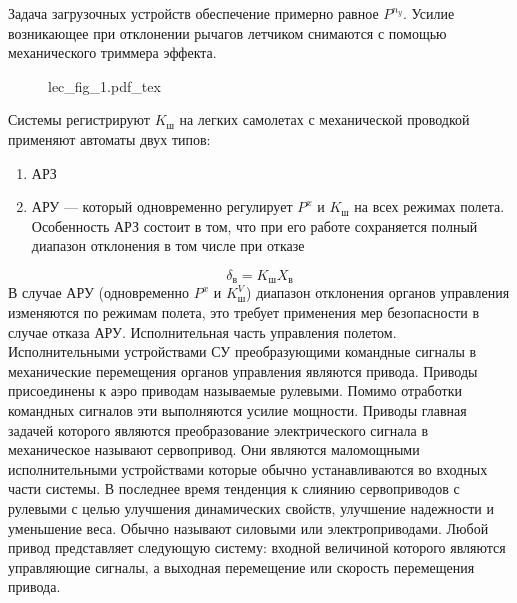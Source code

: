 \documentclass{article}
\begin{document}
Задача загрузочных устройств обеспечение примерно равное $P^{n_y}$. Усилие
возникающее при отклонении рычагов летчиком снимаются с помощью механического
триммера эффекта.
\begin{figure}[ht!]
	\centering
	{lec_fig_1.pdf_tex}
\end{figure}
Системы регистрируют $K_\text{ш}$ на легких самолетах с механической проводкой
применяют автоматы двух типов:
\begin{enumerate}
	\item АРЗ
	\item АРУ --- который одновременно регулирует $P^{x}$ и $K_\text{ш}$ на
	      всех режимах полета. Особенность АРЗ состоит в том, что при его работе
	      сохраняется полный диапазон отклонения в том числе при отказе
\end{enumerate}
\[
	\delta_\text{в} = K_\text{ш} X_\text{в}
\]
В случае АРУ (одновременно $P^{x}$ и $K_\text{ш}^V$) диапазон отклонения
органов управления изменяются по режимам полета, это требует применения мер
безопасности в случае отказа АРУ.
Исполнительная часть управления полетом.
Исполнительными устройствами СУ преобразующими командные сигналы в механические
перемещения органов управления являются привода. Приводы присоединены к аэро
приводам называемые рулевыми. Помимо отработки командных сигналов эти
выполняются усилие мощности. Приводы главная задачей которого являются
преобразование электрического сигнала в механическое называют сервопривод. Они
являются маломощными исполнительными устройствами которые обычно
устанавливаются во входных части системы. В последнее время тенденция к слиянию
сервоприводов с рулевыми с целью улучшения динамических свойств, улучшение
надежности и уменьшение веса. Обычно называют силовыми или электроприводами.
Любой привод представляет следующую систему: входной величиной которого
являются управляющие сигналы, а выходная перемещение или скорость перемещения
привода.
\end{document}
